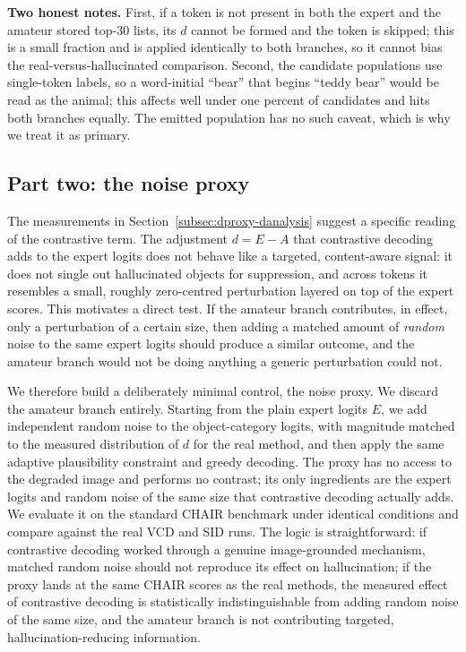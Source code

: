 \documentclass{article}
\begin{document}
\textbf{Two honest notes.} First, if a token is not present in both the expert and
the amateur stored top-30 lists, its $d$ cannot be formed and the token is
skipped; this is a small fraction and is applied identically to both branches, so
it cannot bias the real-versus-hallucinated comparison. Second, the candidate
populations use single-token labels, so a word-initial ``bear'' that begins
``teddy bear'' would be read as the animal; this affects well under one percent
of candidates and hits both branches equally. The emitted population has no such
caveat, which is why we treat it as primary.

\subsection{Part two: the noise proxy}
\label{subsec:dproxy-proxy}

The measurements in Section~\ref{subsec:dproxy-danalysis} suggest a specific
reading of the contrastive term. The adjustment $d = E - A$ that contrastive
decoding adds to the expert logits does not behave like a targeted,
content-aware signal: it does not single out hallucinated objects for
suppression, and across tokens it resembles a small, roughly zero-centred
perturbation layered on top of the expert scores. This motivates a direct test.
If the amateur branch contributes, in effect, only a perturbation of a certain
size, then adding a matched amount of \emph{random} noise to the same expert
logits should produce a similar outcome, and the amateur branch would not be
doing anything a generic perturbation could not.

We therefore build a deliberately minimal control, the noise proxy. We discard
the amateur branch entirely. Starting from the plain expert logits $E$, we add
independent random noise to the object-category logits, with magnitude matched to
the measured distribution of $d$ for the real method, and then apply the same
adaptive plausibility constraint and greedy decoding. The proxy has no access to
the degraded image and performs no contrast; its only ingredients are the expert
logits and random noise of the same size that contrastive decoding actually adds.
We evaluate it on the standard CHAIR benchmark under identical conditions and
compare against the real VCD and SID runs. The logic is straightforward: if
contrastive decoding worked through a genuine image-grounded mechanism, matched
random noise should not reproduce its effect on hallucination; if the proxy lands
at the same CHAIR scores as the real methods, the measured effect of contrastive
decoding is statistically indistinguishable from adding random noise of the same
size, and the amateur branch is not contributing targeted, hallucination-reducing
information.
\end{document}
